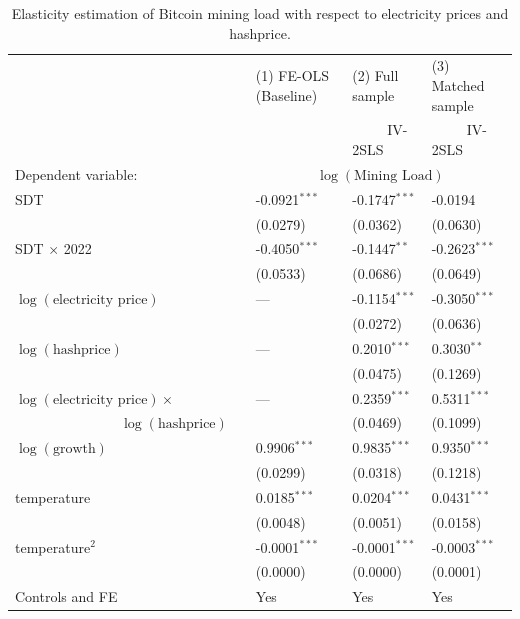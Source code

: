 \documentclass[pdflatex,sn-mathphys-num]{sn-jnl}%
\theoremstyle{thmstyleone}%
\theoremstyle{thmstyletwo}%
\theoremstyle{thmstylethree}%
\begin{document}
\begin{table}[!h]
\caption{Elasticity estimation of Bitcoin mining load with respect to electricity prices and hashprice.}
\label{tab:flexible_load_elasticity}
\begin{tabular}{@{}lllll@{}}
\toprule
 &  & (1) FE-OLS (Baseline) & (2) Full sample & (3) Matched sample \\
 &  &  & ~~~~~IV-2SLS & ~~~~~IV-2SLS \\
\midrule
Dependent variable: & & \multicolumn{3}{c}{$\log(\text{Mining Load})$} \\
\midrule

SDT &  & -0.0921$^{***}$ & -0.1747$^{***}$ & -0.0194 \\
 &  & (0.0279) & (0.0362) & (0.0630) \\[3pt]

SDT $\times$ 2022 &  & -0.4050$^{***}$ & -0.1447$^{**}$ & -0.2623$^{***}$ \\
 &  & (0.0533) & (0.0686) & (0.0649) \\[3pt]

$\log(\text{electricity price})$ &  & --- & -0.1154$^{***}$ & -0.3050$^{***}$ \\
 &  &  & (0.0272) & (0.0636) \\[3pt]

$\log(\text{hashprice})$ &  & --- & 0.2010$^{***}$ & 0.3030$^{**}$ \\
 &  &  & (0.0475) & (0.1269) \\[3pt]

$\log(\text{electricity price}) \times$ &  & --- & 0.2359$^{***}$ & 0.5311$^{***}$ \\
~~~~~~~~~~~~~~~$\log(\text{hashprice})$ &  &  & (0.0469) & (0.1099) \\[3pt]

$\log(\text{growth})$ &  & 0.9906$^{***}$ & 0.9835$^{***}$ & 0.9350$^{***}$ \\
 &  & (0.0299) & (0.0318) & (0.1218) \\[3pt]

temperature &  & 0.0185$^{***}$ & 0.0204$^{***}$ & 0.0431$^{***}$ \\
 &  & (0.0048) & (0.0051) & (0.0158) \\[3pt]

temperature$^{2}$ &  & -0.0001$^{***}$ & -0.0001$^{***}$ & -0.0003$^{***}$ \\
 &  & (0.0000) & (0.0000) & (0.0001) \\[3pt]

Controls and FE &  & Yes & Yes & Yes \\[3pt]


\end{tabular}
\end{table}
\end{document}
